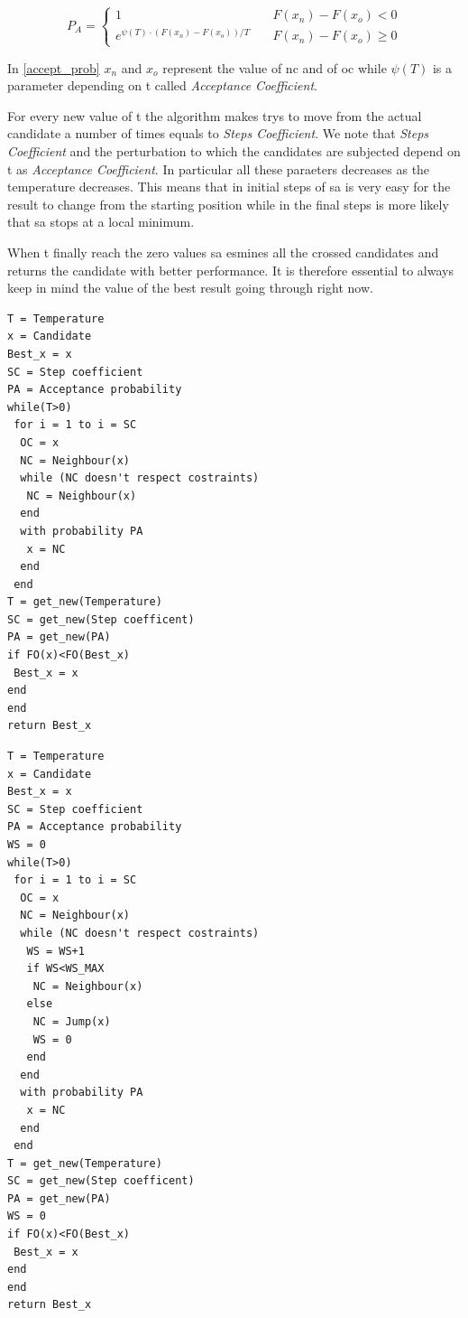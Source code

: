 \documentclass[journal]{IEEEtran}
\begin{document}
 \begin{equation}
 	\label{accept_prob}
	P_A = \begin{cases}
		1 & \quad F(x_n)-F(x_o) < 0 \\
		e^{\psi(T)\cdot(F(x_n)-F(x_o))/T } & \quad F(x_n)-F(x_o) \geq 0
\end{cases}
 \end{equation}

In \ref{accept_prob} $x_n$ and $x_o$ represent the value of \gls{nc} and of \gls{oc} while $\psi(T)$ is a parameter depending on \gls{t} called \textit{Acceptance Coefficient}.

For every new value of \gls{t} the algorithm makes trys to move from the actual candidate a number of times equals to \textit{Steps Coefficient}. We note that \textit{Steps Coefficient} and the perturbation to which the candidates are subjected depend on \gls{t} as \textit{Acceptance Coefficient}. In particular all these paraeters decreases as the temperature decreases. This means that in initial steps of \gls{sa} is very easy for the result to change from the starting position while in the final steps is more likely that \gls{sa} stops at a local minimum.

When \gls{t} finally reach the zero values \gls{sa} esmines all the crossed candidates and returns the candidate with better performance.
It is therefore essential to always keep in mind the value of the best result going through right now.

\pagebreak

\begin{lstlisting}[frame=single]
T = Temperature
x = Candidate
Best_x = x
SC = Step coefficient
PA = Acceptance probability
while(T>0)
 for i = 1 to i = SC
  OC = x
  NC = Neighbour(x)
  while (NC doesn't respect costraints)
   NC = Neighbour(x)
  end
  with probability PA
   x = NC
  end
 end
T = get_new(Temperature)
SC = get_new(Step coefficent)
PA = get_new(PA)
if FO(x)<FO(Best_x)
 Best_x = x
end
end
return Best_x
\end{lstlisting} 

\pagebreak

\begin{lstlisting}[frame=single]
T = Temperature
x = Candidate
Best_x = x
SC = Step coefficient
PA = Acceptance probability
WS = 0
while(T>0)
 for i = 1 to i = SC
  OC = x
  NC = Neighbour(x)
  while (NC doesn't respect costraints)
   WS = WS+1
   if WS<WS_MAX
    NC = Neighbour(x)
   else
    NC = Jump(x)
    WS = 0
   end
  end
  with probability PA
   x = NC
  end
 end
T = get_new(Temperature)
SC = get_new(Step coefficent)
PA = get_new(PA)
WS = 0
if FO(x)<FO(Best_x)
 Best_x = x
end
end
return Best_x
\end{lstlisting} 
\end{document}
